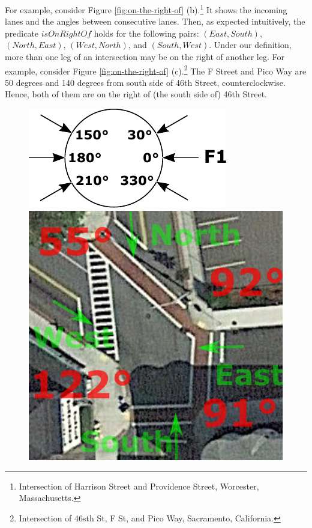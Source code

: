 For example,
consider Figure \ref{fig:on-the-right-of} (b).\footnote{Intersection of
Harrison Street and Providence Street, Worcester, Massachusetts.}
It shows the incoming lanes
and the angles between consecutive lanes.
Then, as expected intuitively,
the predicate $isOnRightOf$ holds for the following pairs:
$(East, South)$,
$(North, East)$,
$(West, North)$, and
$(South, West)$.
Under our definition,
more than one leg of an intersection may be on the right of another leg.
For example,
consider Figure \ref{fig:on-the-right-of} (c).\footnote{Intersection of
46sth St, F St, and Pico Way, Sacramento, California.}
The F Street and Pico Way are 50 degrees and 140 degrees from south side of 46th Street,
counterclockwise.
Hence, both of them are on the right of (the south side of) 46th Street.
\begin{figure}%
  \centering
  \begin{minipage}[b]{.3\linewidth}
      {\includegraphics[width=\linewidth]{figures/chapter3/onTheRightOf_Horizontal.pdf}}
      {\includegraphics[width=\linewidth]{figures/chapter3/onTheRightOf_Harison-Providence.pdf}}%

\end{minipage}
\end{figure}
